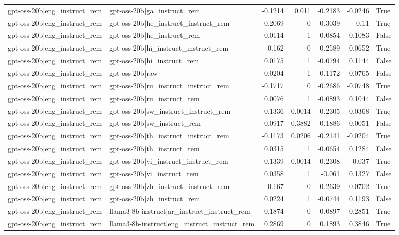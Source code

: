 \begin{table}
\begin{tabular}{l l r r r r l}
gpt-oss-20b|eng_instruct_rem & gpt-oss-20b|ga_instruct_rem & -0.1214 & 0.011 & -0.2183 & -0.0246 & True \\
gpt-oss-20b|eng_instruct_rem & gpt-oss-20b|he_instruct_instruct_rem & -0.2069 & 0 & -0.3039 & -0.11 & True \\
gpt-oss-20b|eng_instruct_rem & gpt-oss-20b|he_instruct_rem & 0.0114 & 1 & -0.0854 & 0.1083 & False \\
gpt-oss-20b|eng_instruct_rem & gpt-oss-20b|hi_instruct_instruct_rem & -0.162 & 0 & -0.2589 & -0.0652 & True \\
gpt-oss-20b|eng_instruct_rem & gpt-oss-20b|hi_instruct_rem & 0.0175 & 1 & -0.0794 & 0.1144 & False \\
gpt-oss-20b|eng_instruct_rem & gpt-oss-20b|raw & -0.0204 & 1 & -0.1172 & 0.0765 & False \\
gpt-oss-20b|eng_instruct_rem & gpt-oss-20b|ru_instruct_instruct_rem & -0.1717 & 0 & -0.2686 & -0.0748 & True \\
gpt-oss-20b|eng_instruct_rem & gpt-oss-20b|ru_instruct_rem & 0.0076 & 1 & -0.0893 & 0.1044 & False \\
gpt-oss-20b|eng_instruct_rem & gpt-oss-20b|sw_instruct_instruct_rem & -0.1336 & 0.0014 & -0.2305 & -0.0368 & True \\
gpt-oss-20b|eng_instruct_rem & gpt-oss-20b|sw_instruct_rem & -0.0917 & 0.3882 & -0.1886 & 0.0051 & False \\
gpt-oss-20b|eng_instruct_rem & gpt-oss-20b|th_instruct_instruct_rem & -0.1173 & 0.0206 & -0.2141 & -0.0204 & True \\
gpt-oss-20b|eng_instruct_rem & gpt-oss-20b|th_instruct_rem & 0.0315 & 1 & -0.0654 & 0.1284 & False \\
gpt-oss-20b|eng_instruct_rem & gpt-oss-20b|vi_instruct_instruct_rem & -0.1339 & 0.0014 & -0.2308 & -0.037 & True \\
gpt-oss-20b|eng_instruct_rem & gpt-oss-20b|vi_instruct_rem & 0.0358 & 1 & -0.061 & 0.1327 & False \\
gpt-oss-20b|eng_instruct_rem & gpt-oss-20b|zh_instruct_instruct_rem & -0.167 & 0 & -0.2639 & -0.0702 & True \\
gpt-oss-20b|eng_instruct_rem & gpt-oss-20b|zh_instruct_rem & 0.0224 & 1 & -0.0744 & 0.1193 & False \\
gpt-oss-20b|eng_instruct_rem & llama3-8b-instruct|ar_instruct_instruct_rem & 0.1874 & 0 & 0.0897 & 0.2851 & True \\
gpt-oss-20b|eng_instruct_rem & llama3-8b-instruct|eng_instruct_instruct_rem & 0.2869 & 0 & 0.1893 & 0.3846 & True \\

\end{tabular}
\end{table}

